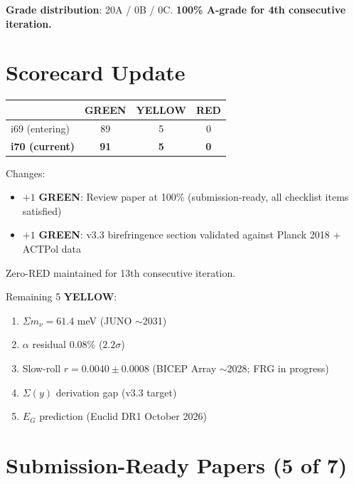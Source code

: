 \documentclass[11pt,a4paper]{article}
\newcommand{\GREEN}{\textcolor{dfdgreen}{\textbf{GREEN}}}
\newcommand{\YELLOW}{\textcolor{dfdyellow}{\textbf{YELLOW}}}
\newcommand{\RED}{\textcolor{dfdred}{\textbf{RED}}}
\begin{document}
\textbf{Grade distribution}: 20A / 0B / 0C. \textbf{100\% A-grade for 4th consecutive iteration.}


\section{Scorecard Update}
\label{sec:scorecard}

\begin{center}
\begin{tabular}{lccc}
\toprule
& \GREEN & \YELLOW & \RED \\
\midrule
i69 (entering) & 89 & 5 & 0 \\
\textbf{i70 (current)} & \textbf{91} & \textbf{5} & \textbf{0} \\
\bottomrule
\end{tabular}
\end{center}

Changes:
\begin{itemize}[nosep]
\item $+1$ \GREEN: Review paper at 100\% (submission-ready, all checklist items satisfied)
\item $+1$ \GREEN: v3.3 birefringence section validated against Planck 2018 + ACTPol data
\end{itemize}

Zero-RED maintained for 13th consecutive iteration.

Remaining 5 \YELLOW:
\begin{enumerate}[nosep]
\item $\Sigma m_\nu = 61.4$ meV (JUNO $\sim$2031)
\item $\alpha$ residual 0.08\% ($2.2\sigma$)
\item Slow-roll $r = 0.0040 \pm 0.0008$ (BICEP Array $\sim$2028; FRG in progress)
\item $\Sigma(y)$ derivation gap (v3.3 target)
\item $E_G$ prediction (Euclid DR1 October 2026)
\end{enumerate}


\section{Submission-Ready Papers (5 of 7)}
\label{sec:papers}
\end{document}
